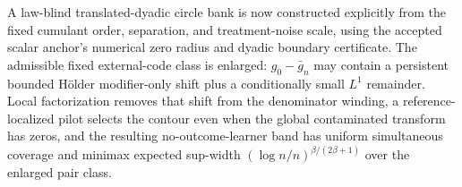 A law-blind translated-dyadic circle bank is now constructed explicitly from the fixed cumulant order, separation, and treatment-noise scale, using the accepted scalar anchor's numerical zero radius and dyadic boundary certificate.  The admissible fixed external-code class is enlarged: \(g_0-\bar g_n\) may contain a persistent bounded Hölder modifier-only shift plus a conditionally small \(L^1\) remainder.  Local factorization removes that shift from the denominator winding, a reference-localized pilot selects the contour even when the global contaminated transform has zeros, and the resulting no-outcome-learner band has uniform simultaneous coverage and minimax expected sup-width \((\log n/n)^{\beta/(2\beta+1)}\) over the enlarged pair class.